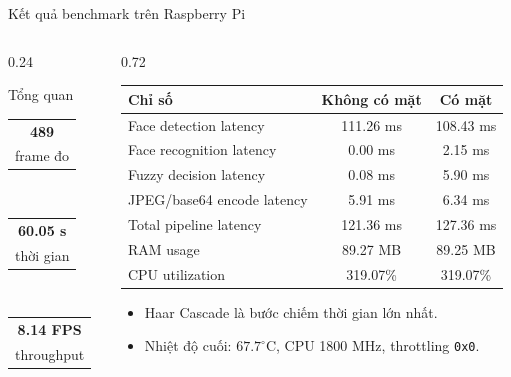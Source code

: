 \documentclass[aspectratio=169,11pt]{beamer}
\makeatletter
\newcommand{\code}[1]{\texttt{\small #1}}
\newcommand{\metric}[2]{\begin{tabular}{@{}c@{}}\Large\textbf{#1}\\[-1mm]\scriptsize #2\end{tabular}}
\makeatother
\begin{document}
\begin{frame}{Kết quả benchmark trên Raspberry Pi}
    \begin{columns}[T]
        \begin{column}{0.24\textwidth}
            \begin{block}{Tổng quan}
                \centering
                \metric{489}{frame đo}\\[3mm]
                \metric{60.05 s}{thời gian}\\[3mm]
                \metric{8.14 FPS}{throughput}
            \end{block}
        \end{column}
        \begin{column}{0.72\textwidth}
            \small
            \begin{tabular}{@{}lcc@{}}
                \toprule
                \textbf{Chỉ số} & \textbf{Không có mặt} & \textbf{Có mặt}\\
                \midrule
                Face detection latency & 111.26 ms & 108.43 ms\\
                Face recognition latency & 0.00 ms & 2.15 ms\\
                Fuzzy decision latency & 0.08 ms & 5.90 ms\\
                JPEG/base64 encode latency & 5.91 ms & 6.34 ms\\
                Total pipeline latency & 121.36 ms & 127.36 ms\\
                RAM usage & 89.27 MB & 89.25 MB\\
                CPU utilization & 319.07\% & 319.07\%\\
                \bottomrule
            \end{tabular}

            \vspace{3mm}
            \begin{itemize}
                \item Haar Cascade là bước chiếm thời gian lớn nhất.
                \item Nhiệt độ cuối: $67.7^\circ$C, CPU 1800 MHz, throttling \code{0x0}.
            \end{itemize}
        \end{column}
    \end{columns}
\end{frame}
\end{document}
